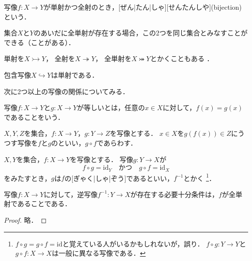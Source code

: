 \documentclass[../sotsu.tex]{subfiles}
\begin{document}
\begin{definition}[全単射]
    \label{dfn:bijection}
    写像$f \colon X \to Y$が単射かつ全射のとき，[ぜん|たん|しゃ][せんたんしや](bijection)という．
\end{definition}

集合$X$と$Y$のあいだに全単射が存在する場合，この2つを同じ集合とみなすことができる（ことがある）．

単射を$X \rightarrowtail Y$，
全射を$X \twoheadrightarrow Y$，
全単射を$X \twoheadrightarrowtail Y$とかくこともある%
\cite{unicode-arrows}\cite{unicode-arrows-B}．

\begin{example}
    包含写像$X \hookrightarrow Y$は単射である．
\end{example}

次に2つ以上の写像の関係についてみる．

\begin{definition}[写像の一致]
    写像$f \colon X \to Y$と$g \colon X \to Y$が等しいとは，任意の$x \in X$に対して，$f(x) = g(x)$であることをいう．
\end{definition}

\begin{definition}[写像の合成]
    \label{dfn:map-composition}
    $X, Y, Z$を集合，$f \colon X \to Y$，$g \colon Y \to Z$を写像とする．
    $x \in X$を$g(f(x)) \in Z$にうつす写像を$f$と$g$のといい，$g \circ f$であらわす．
\end{definition}

\begin{definition}[逆写像]
    \label{dfn:inverse-map}
    $X, Y$を集合，$f \colon X \to Y$を写像とする．
    写像$g \colon Y \to X$が
    \[  f \circ g = \mathrm{id}_Y  \quad \text{かつ} \quad  g \circ f = \mathrm{id}_X  \]
    をみたすとき，$g$は$f$の[ぎゃく|しゃ|ぞう]であるといい，$f^{-1}$とかく%
    \footnote{
        $f \circ g = g \circ f = \mathrm{id}$と覚えている人がいるかもしれないが，誤り．
        $f \circ g \colon Y \to Y$と$g \circ f \colon X \to X$は一般に異なる写像である．
    }．
\end{definition}

\begin{theorem}
    \label{thm:inverse-map-exists-iff}
    写像$f \colon X \to Y$に対して，逆写像$f^{-1} \colon Y \to X$が存在する必要十分条件は，$f$が全単射であることである．
\end{theorem}

\begin{proof}
    略．
\end{proof}
\end{document}
